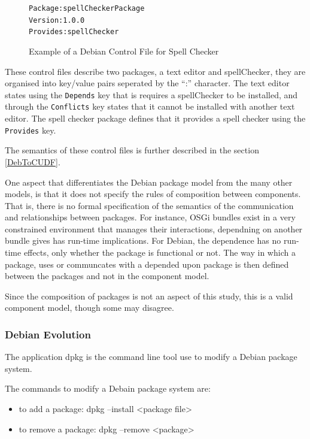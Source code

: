 \begin{figure}[htp]
\begin{center}
\begin{alltt}
Package: spellCheckerPackage
Version: 1.0.0
Provides: spellChecker
\end{alltt}
  \caption[Debian Control files for Spell Checker]{Example of a Debian Control File for Spell Checker}
  \label{debianmetadatasc}
\end{center}
\end{figure}

These control files describe two packages, a text editor and spellChecker, they are organised into key/value pairs seperated by the ``:'' character.
The text editor states using the \verb+Depends+ key that is requires a spellChecker to be installed, 
and through the \verb+Conflicts+ key states that it cannot be installed with another text editor.
The spell checker package defines that it provides a spell checker  using the \verb+Provides+ key.

The semantics of these control files is further described in the section \ref{DebToCUDF}.

One aspect that differentiates the Debian package model from the many other models, is that it does not specify the rules of composition between components.
That is, there is no formal specification of the semantics of the communication and relationships between packages.
For instance, OSGi bundles exist in a very constrained environment that manages their interactions, dependning on another bundle gives has run-time implications.
For Debian, the dependence has no run-time effects, only whether the package is functional or not.
The way in which a package, uses or communcates with a depended upon package is then defined between the packages and not in the component model.

Since the composition of packages is not an aspect of this study, this is a valid component model, though some may disagree.


\subsubsection{Debian Evolution}
The application dpkg is the command line tool use to modify a Debian package system.

The commands to modify a Debain package system are:
\begin{itemize}
  \item to add a package: dpkg --install <package file>
  \item to remove a package: dpkg --remove <package>
\end{itemize}


